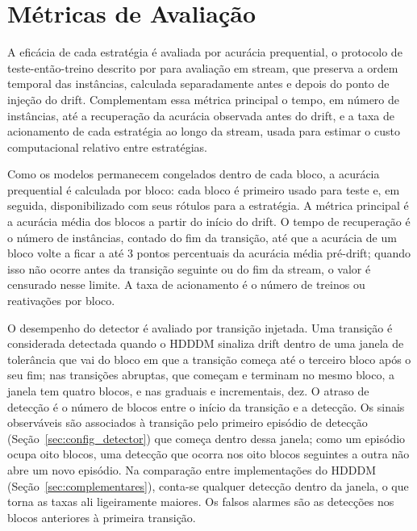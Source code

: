 \section{Métricas de Avaliação}
\label{sec:metricas}
A eficácia de cada estratégia é avaliada por acurácia prequential, o
protocolo de teste-então-treino descrito por  para
avaliação em stream, que preserva a ordem temporal das instâncias, calculada
separadamente antes e depois do ponto de injeção do drift. Complementam
essa métrica principal o tempo, em número de instâncias, até a recuperação da
acurácia observada antes do drift, e a taxa de acionamento de cada estratégia
ao longo da stream, usada para estimar o custo computacional relativo entre
estratégias.

Como os modelos permanecem congelados dentro de cada bloco, a acurácia
prequential é calculada por bloco: cada bloco é primeiro usado para teste e,
em seguida, disponibilizado com seus rótulos para a estratégia. A métrica
principal é a acurácia média dos blocos a partir do início do drift. O tempo
de recuperação é o número de instâncias, contado do fim da transição, até que
a acurácia de um bloco volte a ficar a até 3 pontos percentuais da acurácia
média pré-drift; quando isso não ocorre antes da transição seguinte ou do
fim da stream, o valor é censurado nesse limite. A taxa de acionamento é o
número de treinos ou reativações por bloco.

O desempenho do detector é avaliado por transição injetada. Uma transição é
considerada detectada quando o HDDDM sinaliza drift dentro de uma janela de
tolerância que vai do bloco em que a transição começa até o terceiro bloco
após o seu fim; nas transições abruptas, que começam e terminam no mesmo
bloco, a janela tem quatro blocos, e nas graduais e incrementais, dez. O
atraso de detecção é o número de blocos entre o início da transição e a
detecção. Os sinais observáveis são associados à transição pelo primeiro
episódio de detecção (Seção~\ref{sec:config_detector}) que começa dentro
dessa janela; como um episódio ocupa oito blocos, uma detecção que ocorra
nos oito blocos seguintes a outra não abre um novo episódio. Na comparação
entre implementações do HDDDM (Seção~\ref{sec:complementares}), conta-se
qualquer detecção dentro da janela, o que torna as taxas ali ligeiramente
maiores. Os falsos alarmes são as detecções nos blocos anteriores à primeira
transição.

